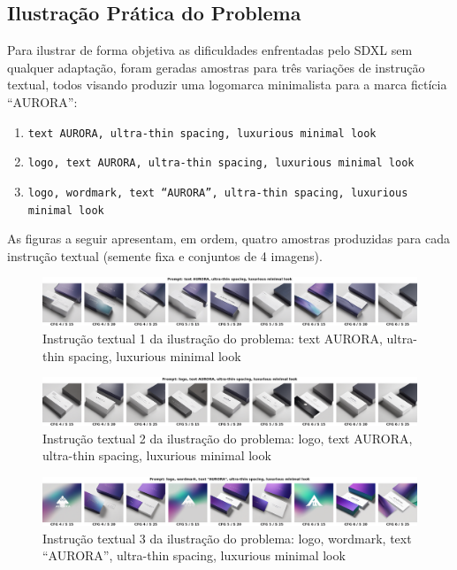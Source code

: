 \documentclass[12pt, %
openright, 
oneside, %
a4paper,    %
brazil]{facom-ufu-abntex2}
\begin{document}
\subsection*{Ilustração Prática do Problema}

Para ilustrar de forma objetiva as dificuldades enfrentadas pelo SDXL sem qualquer adaptação, foram geradas amostras para três variações de instrução textual, todos visando produzir uma logomarca minimalista para a marca fictícia ``AURORA'':

\begin{enumerate}
    \item \texttt{text AURORA, ultra-thin spacing, luxurious minimal look}
    \item \texttt{logo, text AURORA, ultra-thin spacing, luxurious minimal look}
    \item \texttt{logo, wordmark, text ``AURORA'', ultra-thin spacing, luxurious minimal look}
\end{enumerate}

As figuras a seguir apresentam, em ordem, quatro amostras produzidas para cada instrução textual (semente fixa e conjuntos de 4 imagens).

\begin{figure}[H]
    \centering
	\includegraphics[width=\linewidth]{figuras/resultados/good/base/p1_batch0.png}
    \caption{Instrução textual 1 da ilustração do problema: text AURORA, ultra-thin spacing, luxurious minimal look}
    \label{fig:sdxl_base_p1}
\end{figure}

\begin{figure}[H]
    \centering
	\includegraphics[width=\linewidth]{figuras/resultados/good/base/p2_batch0.png}
    \caption{Instrução textual 2 da ilustração do problema: logo, text AURORA, ultra-thin spacing, luxurious minimal look}
    \label{fig:sdxl_base_p2}
\end{figure}

\begin{figure}[H]
    \centering
	\includegraphics[width=\linewidth]{figuras/resultados/good/base/p3_batch0.png}
    \caption{Instrução textual 3 da ilustração do problema: logo, wordmark, text ``AURORA'', ultra-thin spacing, luxurious minimal look}
    \label{fig:sdxl_base_p3}
\end{figure}
\end{document}
